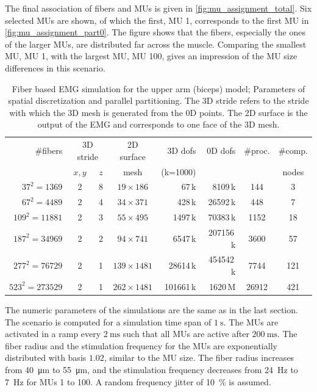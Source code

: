 The final association of fibers and MUs is given in \cref{fig:mu_assignment_total}. Six selected MUs are shown, of which the first, MU 1, corresponds to the first MU in \cref{fig:mu_assignment_part0}. The figure shows that the fibers, especially the ones of the larger MUs, are distributed far across the muscle. Comparing the smallest MU, MU 1, with the largest MU, MU 100, gives an impression of the MU size differences in this scenario.


\begin{table}
  \centering%
  \begin{tabular}{|r|c|c|c|r|r|c|c|}
    \hline
    \#fibers        & \multicolumn{2}{c|}{3D stride} & 2D surface  & 3D dofs    & 0D dofs & \#proc. & \#comp.\\
    \cline{2-3}
                         & $x,y$ & $z$                & mesh       & (k=1000)      &  && nodes\\
    \hline
    $37^2=\num{1369}$    & 2     & 8  & $19 \times 186$  & \num{67}\,k     & \num{8109}\,k  & \num{144} & 3\\[2mm]  %
    $67^2=\num{4489}$    & 2     & 4  & $34 \times 371$  & \num{428}\,k     & \num{26592}\,k  & \num{448} & 7\\[2mm]  %
    $109^2=\num{11881}$  & 2     & 3  & $55 \times 495$  & \num{1497}\,k     & \num{70383}\,k  & \num{1152} & 18\\[2mm]  %
    $187^2=\num{34969}$  & 2     & 2  & $94 \times 741$  & \num{6547}\,k     & \num{207156}\,k  & \num{3600} & 57\\[2mm] %
    $277^2=\num{76729}$  & 2     & 1  & $139 \times 1481$  & \num{28614}\,k  & \num{454542}\,k  & \num{7744} & 121\\[2mm] %
    $523^2=\num{273529}$ & 2     & 1  & $262 \times 1481$  & \num{101661}\,k  & \num{1620}\,M  & \num{26912} & 421\\ %
    \hline
  \end{tabular}
  \caption{Fiber based EMG simulation for the upper arm (biceps) model; Parameters of spatial discretization and parallel partitioning. The 3D stride refers to the stride with which the 3D mesh is generated from the 0D points. The 2D surface is the output of the EMG and corresponds to one face of the 3D mesh.}%
  \label{tab:emg_study_parameters}%
\end{table}

The numeric parameters of the simulations are the same as in the last section. The scenario is computed for a simulation time span of $\SI{1}{\s}$. The MUs are activated in a ramp every $\SI{2}{\ms}$ such that all MUs are active after $\SI{200}{\ms}$. The fiber radius
and the stimulation frequency for the MUs are exponentially distributed with basis $1.02$, similar to the MU size. The fiber radius increases from \SI{40}{\micro\meter} to \SI{55}{\micro\meter}, and the stimulation frequency decreases from \SI{24}{\hertz} to \SI{7}{\hertz} for MUs 1 to 100. A random frequency jitter of \SI{10}{\percent} is assumed.

